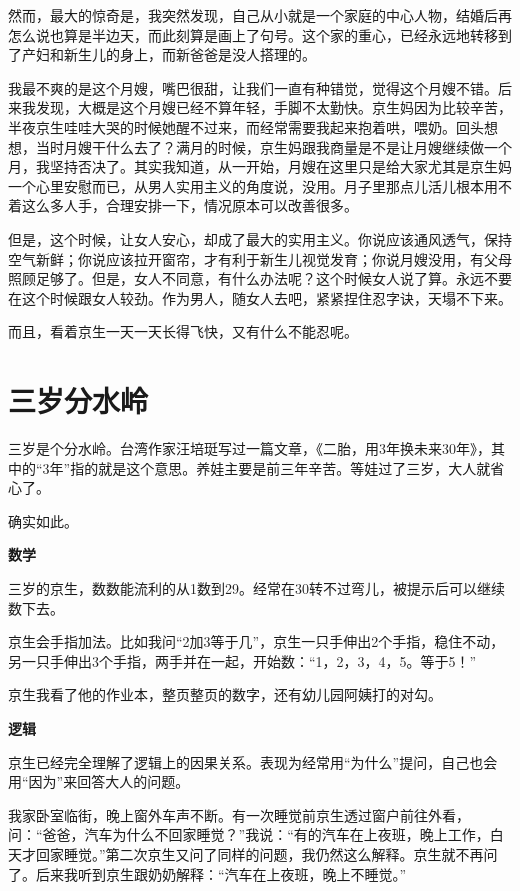 \documentclass[twoside,openright,headings=optiontohead]{ctexbook} %
\begin{document}
{然而，最大的惊奇是，我突然发现，自己从小就是一个家庭的中心人物，结婚后再怎么说也算是半边天，而此刻算是画上了句号。这个家的重心，已经永远地转移到了产妇和新生儿的身上，而新爸爸是没人搭理的。

我最不爽的是这个月嫂，嘴巴很甜，让我们一直有种错觉，觉得这个月嫂不错。后来我发现，大概是这个月嫂已经不算年轻，手脚不太勤快。京生妈因为比较辛苦，半夜京生哇哇大哭的时候她醒不过来，而经常需要我起来抱着哄，喂奶。回头想想，当时月嫂干什么去了？满月的时候，京生妈跟我商量是不是让月嫂继续做一个月，我坚持否决了。其实我知道，从一开始，月嫂在这里只是给大家尤其是京生妈一个心里安慰而已，从男人实用主义的角度说，没用。月子里那点儿活儿根本用不着这么多人手，合理安排一下，情况原本可以改善很多。

但是，这个时候，让女人安心，却成了最大的实用主义。你说应该通风透气，保持空气新鲜；你说应该拉开窗帘，才有利于新生儿视觉发育；你说月嫂没用，有父母照顾足够了。但是，女人不同意，有什么办法呢？这个时候女人说了算。永远不要在这个时候跟女人较劲。作为男人，随女人去吧，紧紧捏住忍字诀，天塌不下来。

而且，看着京生一天一天长得飞快，又有什么不能忍呢。

\chapter*{三岁分水岭}\label{three-year-young}

三岁是个分水岭。台湾作家汪培珽写过一篇文章，《二胎，用3年换未来30年》，其中的``3年''指的就是这个意思。养娃主要是前三年辛苦。等娃过了三岁，大人就省心了。

确实如此。

\textbf{数学}

三岁的京生，数数能流利的从1数到29。经常在30转不过弯儿，被提示后可以继续数下去。

京生会手指加法。比如我问``2加3等于几''，京生一只手伸出2个手指，稳住不动，另一只手伸出3个手指，两手并在一起，开始数：``1，2，3，4，5。等于5！''

京生我看了他的作业本，整页整页的数字，还有幼儿园阿姨打的对勾。

\textbf{逻辑}

京生已经完全理解了逻辑上的因果关系。表现为经常用``为什么''提问，自己也会用``因为''来回答大人的问题。

我家卧室临街，晚上窗外车声不断。有一次睡觉前京生透过窗户前往外看，问：``爸爸，汽车为什么不回家睡觉？''我说：``有的汽车在上夜班，晚上工作，白天才回家睡觉。''第二次京生又问了同样的问题，我仍然这么解释。京生就不再问了。后来我听到京生跟奶奶解释：``汽车在上夜班，晚上不睡觉。''

}
\end{document}

